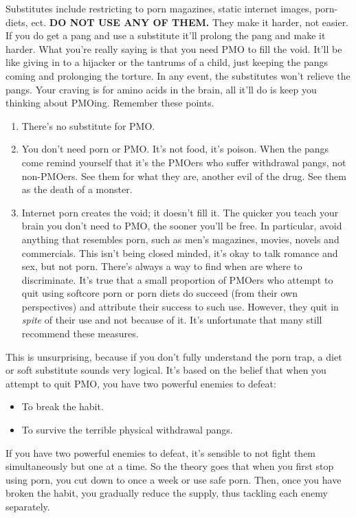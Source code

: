 \documentclass[easypeasy.tex]{subfiles}
\begin{document}
Substitutes include restricting to porn magazines, static internet images, porn-diets, ect. \textbf{DO NOT USE ANY OF THEM.} They make it harder, not easier. If you do get a pang and use a substitute it'll prolong the pang and make it harder. What you're really saying is that you need PMO to fill the void. It'll be like giving in to a hijacker or the tantrums of a child, just keeping the pangs coming and prolonging the torture. In any event, the substitutes won't relieve the pangs. Your craving is for amino acids in the brain, all it'll do is keep you thinking about PMOing. Remember these points.
\begin{enumerate}
  \item There's no substitute for PMO.
  \item You don't need porn or PMO. It's not food, it's poison. When the pangs come remind yourself that it's the PMOers who suffer withdrawal pangs, not non-PMOers. See them for what they are, another evil of the drug. See them as the death of a monster.
  \item Internet porn creates the void; it doesn't fill it. The quicker you teach your brain you don't need to PMO, the sooner you'll be free. In particular, avoid anything that resembles porn, such as men's magazines, movies, novels and commercials. This isn't being closed minded, it's okay to talk romance and sex, but not porn. There's always a way to find when are where to discriminate. It's true that a small proportion of PMOers who attempt to quit using softcore porn or porn diets do succeed (from their own perspectives) and attribute their success to such use. However, they quit in \textit{spite} of their use and not because of it. It's unfortunate that many still recommend these measures.
\end{enumerate}

This is unsurprising, because if you don't fully understand the porn trap, a diet or soft substitute sounds very logical. It's based on the belief that when you attempt to quit PMO, you have two powerful enemies to defeat:
\begin{itemize}
  \item To break the habit.
  \item To survive the terrible physical withdrawal pangs.
\end{itemize}

If you have two powerful enemies to defeat, it's sensible to not fight them simultaneously but one at a time. So the theory goes that when you first stop using porn, you cut down to once a week or use safe porn. Then, once you have broken the habit, you gradually reduce the supply, thus tackling each enemy separately.
\end{document}
